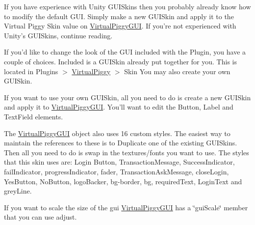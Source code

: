 If you have experience with Unity G\-U\-I\-Skins then you probably already know how to modify the default G\-U\-I. Simply make a new G\-U\-I\-Skin and apply it to the Virtual Piggy Skin value on \hyperlink{class_virtual_piggy_g_u_i}{Virtual\-Piggy\-G\-U\-I}. If you're not experienced with Unity's G\-U\-I\-Skins, continue reading.

If you'd like to change the look of the G\-U\-I included with the Plugin, you have a couple of choices. Included is a G\-U\-I\-Skin already put together for you. This is located in Plugins $>$ \hyperlink{class_virtual_piggy}{Virtual\-Piggy} $>$ Skin You may also create your own G\-U\-I\-Skin.

If you want to use your own G\-U\-I\-Skin, all you need to do is create a new G\-U\-I\-Skin and apply it to \hyperlink{class_virtual_piggy_g_u_i}{Virtual\-Piggy\-G\-U\-I}. You'll want to edit the Button, Label and Text\-Field elements.

The \hyperlink{class_virtual_piggy_g_u_i}{Virtual\-Piggy\-G\-U\-I} object also uses 16 custom styles. The easiest way to maintain the references to these is to Duplicate one of the existing G\-U\-I\-Skins. Then all you need to do is swap in the textures/fonts you want to use. The styles that this skin uses are\-: Login Button, Transaction\-Message, Success\-Indicator, fail\-Indicator, progress\-Indicator, fader, Transaction\-Ask\-Message, close\-Login, Yes\-Button, No\-Button, logo\-Backer, bg-\/border, bg, required\-Text, Login\-Text and grey\-Line.

If you want to scale the size of the gui \hyperlink{class_virtual_piggy_g_u_i}{Virtual\-Piggy\-G\-U\-I} has a \char`\"{}gui\-Scale\char`\"{} member that you can use adjust. 